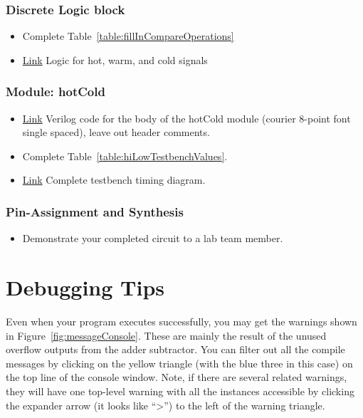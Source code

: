 \subsubsection{Discrete Logic block}
\begin{itemize}
    \item Complete Table~\ref{table:fillInCompareOperations}

    \item \protect\hyperlink{hotWarmCold_Logic}{Link} Logic for hot, warm, and cold signals
\end{itemize}

\subsubsection{Module: hotCold}

\begin{itemize}
    \item
        \protect\hyperlink{hilow-module}{Link} Verilog code for the body of
        the hotCold module (courier 8-point font single spaced), leave out
        header comments.
    \item  Complete Table~\ref{table:hiLowTestbenchValues}.
    \item  \protect\hyperlink{hilow_tb-module}{Link}  Complete testbench timing diagram.
\end{itemize}

\subsubsection{Pin-Assignment and Synthesis}
\begin{itemize}
    \item Demonstrate your completed circuit to a lab team member.
\end{itemize}

\section{Debugging Tips}
\label{section:hiLowHintDebugging}

Even when your program executes successfully, you may get the warnings shown in
Figure~\ref{fig:messageConsole}. These are mainly the result of the unused overflow outputs
from the adder subtractor. You can filter out all the compile messages
by clicking on the yellow triangle (with the blue three in this case) on
the top line of the console window. Note, if there are several related
warnings, they will have one top-level warning with all the instances
accessible by clicking the expander arrow (it looks like
``\textgreater'') to the left of the warning triangle.

